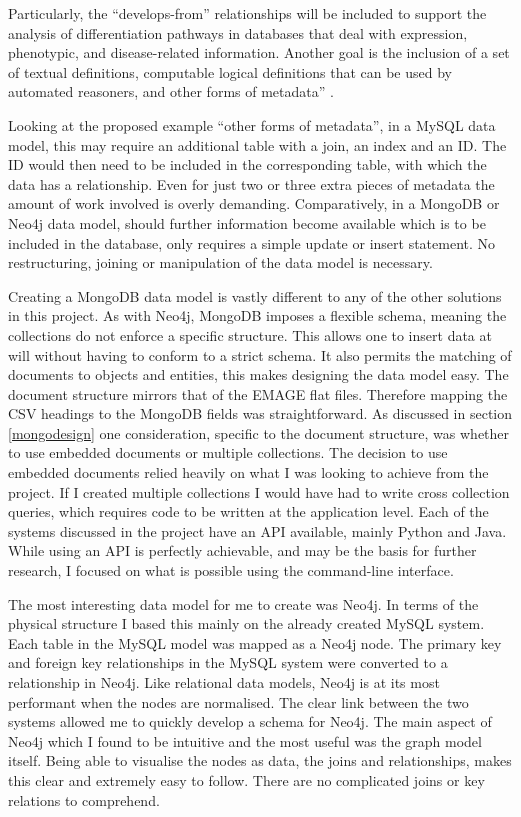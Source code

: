 Particularly, the ``develops-from'' relationships will be included to support the analysis of differentiation pathways in databases that deal with expression, phenotypic, and disease-related information. Another goal is the inclusion of a set of textual definitions, computable logical definitions that can be used by automated reasoners, and other forms of metadata'' \cite{biomed}.

Looking at the proposed example ``other forms of metadata'', in a MySQL data model, this may require an additional table with a join, an index and an ID. The ID would then need to be included in the corresponding table, with which the data has a relationship. Even for just two or three extra pieces of metadata the amount of work involved is overly demanding. Comparatively, in a MongoDB or Neo4j data model, should further information become available which is to be included in the database, only requires a simple update or insert statement. No restructuring, joining or manipulation of the data model is necessary.

Creating a MongoDB data model is vastly different to any of the other solutions in this project. As with Neo4j, MongoDB imposes a flexible schema, meaning the collections do not enforce a specific structure. This allows one to insert data at will without having to conform to a strict schema. It also permits the matching of documents to objects and entities, this makes designing the data model easy. The document structure mirrors that of the EMAGE flat files. Therefore mapping the CSV headings to the MongoDB fields was straightforward. As discussed in section \ref{mongodesign} one consideration, specific to the document structure, was whether to use embedded documents or multiple collections. The decision to use embedded documents relied heavily on what I was looking to achieve from the project. If I created multiple collections I would have had to write cross collection queries, which requires code to be written at the application level. Each of the systems discussed in the project have an API available, mainly Python and Java. While using an API is perfectly achievable, and may be the basis for further research, I focused on what is possible using the command-line interface. 

The most interesting data model for me to create was Neo4j. In terms of the physical structure I based this mainly on the already created MySQL system. Each table in the MySQL model was mapped as a Neo4j node. The primary key and foreign key relationships in the MySQL system were converted to a relationship in Neo4j. Like relational data models, Neo4j is at its most performant when the nodes are normalised. The clear link between the two systems allowed me to quickly develop a schema for Neo4j. The main aspect of Neo4j which I found to be intuitive and the most useful was the graph model itself. Being able to visualise the nodes as data, the joins and relationships, makes this clear and extremely easy to follow. There are no complicated joins or key relations to comprehend.

